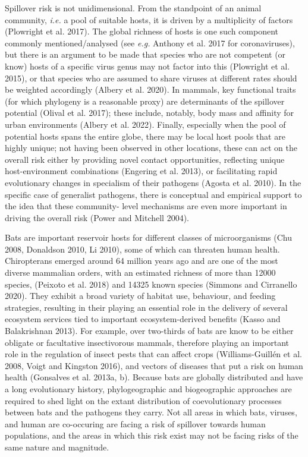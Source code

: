 \documentclass[11pt]{article}
\begin{document}
Spillover risk is not unidimensional. From the standpoint of an animal
community, \emph{i.e.} a pool of suitable hosts, it is driven by a
multiplicity of factors (Plowright et al. 2017). The global richness of
hosts is one such component commonly mentioned/analysed (see \emph{e.g.}
Anthony et al. 2017 for coronaviruses), but there is an argument to be
made that species who are not competent (or know) hosts of a specific
virus genus may not factor into this (Plowright et al. 2015), or that
species who are assumed to share viruses at different rates should be
weighted accordingly (Albery et al. 2020). In mammals, key functional
traits (for which phylogeny is a reasonable proxy) are determinants of
the spillover potential (Olival et al. 2017); these include, notably,
body mass and affinity for urban environments (Albery et al. 2022).
Finally, especially when the pool of potential hosts spans the entire
globe, there may be local host pools that are highly unique; not having
been observed in other locations, these can act on the overall risk
either by providing novel contact opportunities, reflecting unique
host-environment combinations (Engering et al. 2013), or facilitating
rapid evolutionary changes in specialism of their pathogens (Agosta et
al. 2010). In the specific case of generalist pathogens, there is
conceptual and empirical support to the idea that these community- level
mechanisms are even more important in driving the overall risk (Power
and Mitchell 2004).

Bats are important reservoir hosts for different classes of
microorganisms (Chu 2008, Donaldson 2010, Li 2010), some of which can
threaten human health. Chiropterans emerged around 64 million years ago
and are one of the most diverse mammalian orders, with an estimated
richness of more than 12000 species, (Peixoto et al. 2018) and 14325
known species (Simmons and Cirranello 2020). They exhibit a broad
variety of habitat use, behaviour, and feeding strategies, resulting in
their playing an essential role in the delivery of several ecosystem
services tied to important ecosystem-derived benefits (Kasso and
Balakrishnan 2013). For example, over two-thirds of bats are know to be
either obligate or facultative insectivorous mammals, therefore playing
an important role in the regulation of insect pests that can affect
crops (Williams-Guillén et al. 2008, Voigt and Kingston 2016), and
vectors of diseases that put a risk on human health (Gonsalves et al.
2013a, b). Because bats are globally distributed and have a long
evolutionary history, phylogeographic and biogeographic approaches are
required to shed light on the extant distribution of coevolutionary
processes between bats and the pathogens they carry. Not all areas in
which bats, viruses, and human are co-occuring are facing a risk of
spillover towards human populations, and the areas in which this risk
exist may not be facing risks of the same nature and magnitude.
\end{document}
